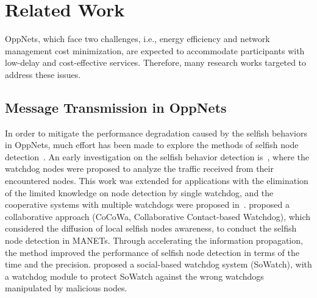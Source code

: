 \section{Related Work}
\label{sec:related}
OppNets, which face two challenges,
i.e., energy efficiency and network management cost minimization,
are expected to accommodate participants
with low-delay and cost-effective services.
Therefore, many research works targeted to address these issues.

\subsection{Message Transmission in OppNets}
In order to mitigate the performance degradation caused by
the selfish behaviors in OppNets,
much effort has been made to explore
the methods of selfish node
detection~\cite{DBLP:journals/tvt/LiSWJSZ11, DBLP:journals/comsur/JedariXN18}.
An early investigation on the selfish behavior detection
is~\cite{DBLP:conf/mobicom/MartiGLB00},
where the watchdog nodes were proposed
to analyze the traffic received from their encountered nodes.
This work was extended for applications with
the elimination of the limited knowledge on node detection by single watchdog,
and the cooperative systems with multiple watchdogs were proposed
in~\cite{DBLP:journals/tmc/Hernandez-Orallo15, DBLP:journals/tie/DiasRXM15,
DBLP:journals/fgcs/JedariXCDTA19}.
\cite{DBLP:journals/tmc/Hernandez-Orallo15} proposed
a collaborative approach (CoCoWa, Collaborative Contact-based Watchdog),
which considered the diffusion of local selfish nodes awareness,
to conduct the selfish node detection in MANETs.
Through accelerating the information propagation,
the method improved the performance of selfish node detection
in terms of the time and the precision.
\cite{DBLP:journals/fgcs/JedariXCDTA19} proposed
a social-based watchdog system (SoWatch),
with a watchdog module to protect SoWatch
against the wrong watchdogs manipulated by malicious nodes.

